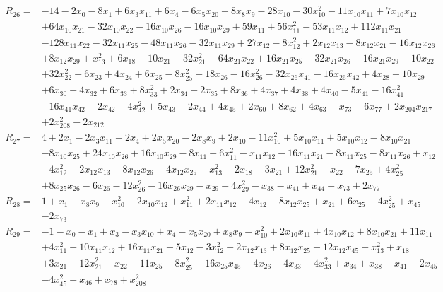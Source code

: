 \begin{align*}
 R_{26}={}&-14 -2x_{0} -8x_{1} +6x_{3}x_{11} +6x_{4} -6x_{5}x_{20} +8x_{8}x_{9} -28x_{10} -30x_{10}^{2} -11x_{10}x_{11} +7x_{10}x_{12}\\
 &+64x_{10}x_{21} -32x_{10}x_{22} -16x_{10}x_{26} -16x_{10}x_{29} +59x_{11} +56x_{11}^{2} -53x_{11}x_{12} +112x_{11}x_{21}\\
 &-128x_{11}x_{22} -32x_{11}x_{25} -48x_{11}x_{26} -32x_{11}x_{29} +27x_{12} -8x_{12}^{2} +2x_{12}x_{13} -8x_{12}x_{21} -16x_{12}x_{26}\\
 &+8x_{12}x_{29} +x_{13}^{2} +6x_{18} -10x_{21} -32x_{21}^{2} -64x_{21}x_{22} +16x_{21}x_{25} -32x_{21}x_{26} -16x_{21}x_{29} -10x_{22}\\
 &+32x_{22}^{2} -6x_{23} +4x_{24} +6x_{25} -8x_{25}^{2} -18x_{26} -16x_{26}^{2} -32x_{26}x_{41} -16x_{26}x_{42} +4x_{28} +10x_{29}\\
 &+6x_{30} +4x_{32} +6x_{33} +8x_{33}^{2} +2x_{34} -2x_{35} +8x_{36} +4x_{37} +4x_{38} +4x_{40} -5x_{41} -16x_{41}^{2}\\
 &-16x_{41}x_{42} -2x_{42} -4x_{42}^{2} +5x_{43} -2x_{44} +4x_{45} +2x_{60} +8x_{62} +4x_{63} -x_{73} -6x_{77} +2x_{204}x_{217}\\
 &+2x_{208}^{2} -2x_{212}
\end{align*}
\begin{align*}
 R_{27}={}&4 +2x_{1} -2x_{3}x_{11} -2x_{4} +2x_{5}x_{20} -2x_{8}x_{9} +2x_{10} -11x_{10}^{2} +5x_{10}x_{11} +5x_{10}x_{12} -8x_{10}x_{21}\\
 &-8x_{10}x_{25} +24x_{10}x_{26} +16x_{10}x_{29} -8x_{11} -6x_{11}^{2} -x_{11}x_{12} -16x_{11}x_{21} -8x_{11}x_{25} -8x_{11}x_{26} +x_{12}\\
 &-4x_{12}^{2} +2x_{12}x_{13} -8x_{12}x_{26} -4x_{12}x_{29} +x_{13}^{2} -2x_{18} -3x_{21} +12x_{21}^{2} +x_{22} -7x_{25} +4x_{25}^{2}\\
 &+8x_{25}x_{26} -6x_{26} -12x_{26}^{2} -16x_{26}x_{29} -x_{29} -4x_{29}^{2} -x_{38} -x_{41} +x_{44} +x_{73} +2x_{77}
\end{align*}
\begin{align*}
 R_{28}={}&1 +x_{1} -x_{8}x_{9} -x_{10}^{2} -2x_{10}x_{12} +x_{11}^{2} +2x_{11}x_{12} -4x_{12} +8x_{12}x_{25} +x_{21} +6x_{25} -4x_{25}^{2} +x_{45}\\
 &-2x_{73}
\end{align*}
\begin{align*}
 R_{29}={}&-1 -x_{0} -x_{1} +x_{3} -x_{3}x_{10} +x_{4} -x_{5}x_{20} +x_{8}x_{9} -x_{10}^{2} +2x_{10}x_{11} +4x_{10}x_{12} +8x_{10}x_{21} +11x_{11}\\
 &+4x_{11}^{2} -10x_{11}x_{12} +16x_{11}x_{21} +5x_{12} -3x_{12}^{2} +2x_{12}x_{13} +8x_{12}x_{25} +12x_{12}x_{45} +x_{13}^{2} +x_{18}\\
 &+3x_{21} -12x_{21}^{2} -x_{22} -11x_{25} -8x_{25}^{2} -16x_{25}x_{45} -4x_{26} -4x_{33} -4x_{33}^{2} +x_{34} +x_{38} -x_{41} -2x_{45}\\
 &-4x_{45}^{2} +x_{46} +x_{78} +x_{208}^{2}
\end{align*}
